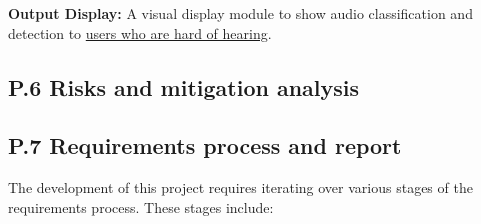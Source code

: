 \documentclass[12pt]{article}
\theoremstyle{definition}
\begin{document}
\textbf{Output Display:}
A visual display module to show audio classification and detection to
\hyperref[stakeholder:hardHearing]{users who are hard of hearing}.

\subsection{P.6 Risks and mitigation analysis}

\subsection{P.7 Requirements process and report}
The development of this project requires iterating over various stages of the
requirements process. These stages include:
\end{document}
